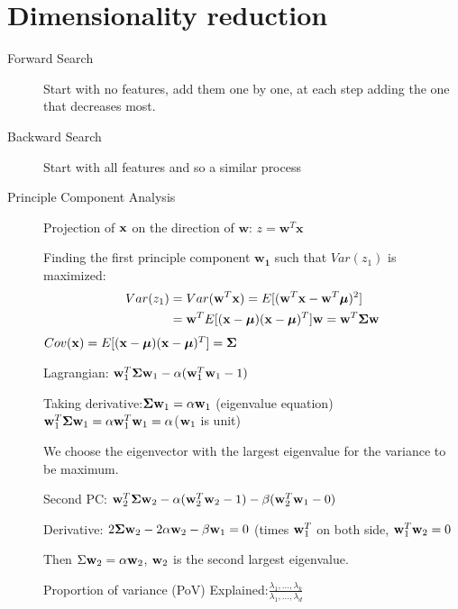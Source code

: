\chapter{Dimensionality reduction}
\begin{description}
    \item[Forward Search] Start with no features, add them one by one, at each
        step adding the one that decreases most.
    \item[Backward Search] Start with all features and so a similar process
         
    \item[Principle Component Analysis]
    Projection of $\mathbf{x}$ on the direction of $\mathbf{w}$: $z = \mathbf{w}^T
    \mathbf{x}$

    Finding the first principle component $\mathbf{w_1}$ such that $Var(z_1)$ is
    maximized:
    \begin{align*} 
    Var(z_1) & = Var(\mathbf{w}^T\mathbf{x}) = E[(\mathbf{w}^T\mathbf{x} - \mathbf{w}^T\mathbf{\boldsymbol\mu})^2]  \\
    & = \mathbf{w}^TE[(\mathbf{x}-\mathbf{\boldsymbol\mu})(\mathbf{x}-\mathbf{\boldsymbol\mu})^T] \mathbf{w} = \mathbf{w}^T\boldsymbol\Sigma \mathbf{w} 
    \end{align*}
    $Cov(\mathbf{x}) = E[(\mathbf{x}-\mathbf{\boldsymbol\mu})(\mathbf{x}-\mathbf{\boldsymbol\mu})^T] = \boldsymbol\Sigma$ 

    Lagrangian: $\mathbf{w}_1^T\boldsymbol\Sigma \mathbf{w}_1 - \alpha(\mathbf{w}_1^T\mathbf{w}_1 -1)$ 

    Taking derivative:$\boldsymbol\Sigma \mathbf{w}_1 = \alpha \mathbf{w}_1$ (eigenvalue equation)
    $\mathbf{w}_1^T \boldsymbol\Sigma \mathbf{w}_1 = \alpha \mathbf{w}_1^T\mathbf{w}_1 = \alpha$($\mathbf{w}_1$ is unit)

    We choose the eigenvector with the largest eigenvalue for the variance to be
    maximum.

    Second PC: $\mathbf{w}_2^T\boldsymbol\Sigma \mathbf{w}_2 - \alpha(\mathbf{w}_2^T\mathbf{w}_2 -1)  - \beta( \mathbf{w}_2^T \mathbf{w}_1 -0) $

    Derivative: $2\boldsymbol\Sigma \mathbf{w}_2 - 2\alpha \mathbf{w}_2 - \beta \mathbf{w}_1 = 0$ (times $\mathbf{w}_1 ^T$ on both
    side, $\mathbf{w}_1 ^T\mathbf{w}_2 = 0$

    Then $\Sigma \mathbf{w}_2 = \alpha \mathbf{w}_2$, $\mathbf{w}_2$ is the second largest eigenvalue.

    Proportion of variance (PoV) Explained:$\frac{\lambda_1,
    \dots,\lambda_k}{\lambda_1, \dots, \lambda_d}$
    

\end{description}
